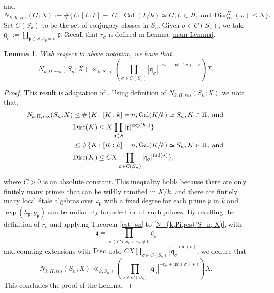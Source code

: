 \documentclass[11pt]{amsart}
\newtheorem{Lemma}[theorem]{Lemma}
\newcommand{\fq}{\mathfrak{q}}
\newcommand{\fp}{\mathfrak{p}}
\newcommand{\disc}{\mathrm{Disc}}
\newcommand{\ind}{\mathrm{ind}}
\newcommand{\op}[1]{\operatorname{#1}}
\numberwithin{equation}{section}
\begin{document}
and
\[
N_{k,\Pi,res}(G; X):= \#\{L: [L:k]=|G|, \op{Gal}(L/k)\simeq G, L \in \Pi, \text{ and }\disc_{res}^\Pi(L) \leq X\}.
\]
Set $C(S_n)$ to be the set of conjugacy classes in $S_n$. Given $\sigma\in C(S_n)$, we take $\fq_\sigma := \prod_{\fp \in S, h_{\fp} = \sigma}\fp$. Recall that $r_\sigma$ is defined in Lemma \ref{main Lemma}.
\begin{Lemma}\label{res sn}
    With respect to above notation, we have that
    \[
    N_{k,\Pi,res}(S_n; X) \ll_{k,S_n, \epsilon} \left(\prod_{\sigma \in C(S_n)}|\fq_\sigma|^{-r_\sigma + \op{ind}(\sigma)+\epsilon}\right)X.
    \]
\end{Lemma}
\begin{proof}
   This result is adaptation of \cite[equation (5.13)]{Wang2020}. Using definition of $N_{k,\Pi,res}(S_n; X)$ we note that,
    \begin{equation}
        \begin{split}\label{N_{k,Pi,res}(S_n; X)}
            N_{k,\Pi,res}(S_n; X) &\leq  \#\{K: [K:k]=n, \op{Gal}(K/k)\simeq S_n, K \in \Pi, \text{ and }\\
            & \disc(K) \leq X\prod_{\fp\in S}|\fp|^{\exp(h_{\fp})}\}\\
            & \leq \#\{K: [K:k]=n, \op{Gal}(K/k)\simeq S_n, K \in \Pi, \text{ and }\\
            & \disc(K) \leq CX \prod_{\sigma \in C(S_n)}|\fq_\sigma|^{\ind(\sigma)}\},
        \end{split}
    \end{equation}
    
    where $C > 0$ is an absolute constant. This inequality holds because there are only finitely many primes that can be wildly ramified in $K/k$, and there are finitely many local étale algebras over $k_{\fp}$ with a fixed degree for each prime $\fp$ in $k$ and $\exp(h_{\fp}, g_{\fp})$ can be uniformly bounded for all such primes. By recalling the definition of $r_{\sigma}$ and applying Theorem \ref{est_sn} to \eqref{N_{k,Pi,res}(S_n; X)}, with 
    \[\fq=\prod_{\sigma \in C(S_n), r_\sigma \neq 0}\fq_\sigma\] and counting extensions with $\disc$ upto $CX \prod_{\sigma \in C(S_n)}|\fq_\sigma|^{\ind(\sigma)}$, we deduce that
    \[
    N_{k,\Pi,res}(S_n; X) \ll_{k,S_n, \epsilon} \left(\prod_{\sigma \in C(S_n)}|\fq_\sigma|^{-r_\sigma + \ind(\sigma) + \epsilon}\right)X.
    \]
    This concludes the proof of the Lemma.
\end{proof}
\end{document}
